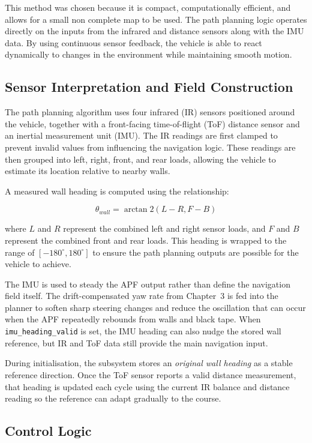 This method was chosen because it is compact, computationally efficient, and allows for a small non complete map to be used. The path planning logic operates directly on the inputs from the infrared and distance sensors along with the IMU data. By using continuous sensor feedback, the vehicle is able to react dynamically to changes in the environment while maintaining smooth motion.

\subsection{Sensor Interpretation and Field Construction}

The path planning algorithm uses four infrared (IR) sensors positioned around the vehicle, together with a front-facing time-of-flight (ToF) distance sensor and an inertial measurement unit (IMU). The IR readings are first clamped to prevent invalid values from influencing the navigation logic. These readings are then grouped into left, right, front, and rear loads, allowing the vehicle to estimate its location relative to nearby walls.

A measured wall heading is computed using the relationship:

\[\theta_{wall} = \arctan2(L - R, F - B)\]

where $L$ and $R$ represent the combined left and right sensor loads, and $F$ and $B$ represent the combined front and rear loads. This heading is wrapped to the range of $[-180^\circ, 180^\circ]$ to ensure the path planning outputs are possible for the vehicle to achieve.

The IMU is used to steady the APF output rather than define the navigation field itself. The drift-compensated yaw rate from Chapter~3 is fed into the planner to soften sharp steering changes and reduce the oscillation that can occur when the APF repeatedly rebounds from walls and black tape. When \texttt{imu\_heading\_valid} is set, the IMU heading can also nudge the stored wall reference, but IR and ToF data still provide the main navigation input.

During initialisation, the subsystem stores an \emph{original wall heading} as a stable reference direction. Once the ToF sensor reports a valid distance measurement, that heading is updated each cycle using the current IR balance and distance reading so the reference can adapt gradually to the course.
\subsection{Control Logic}

